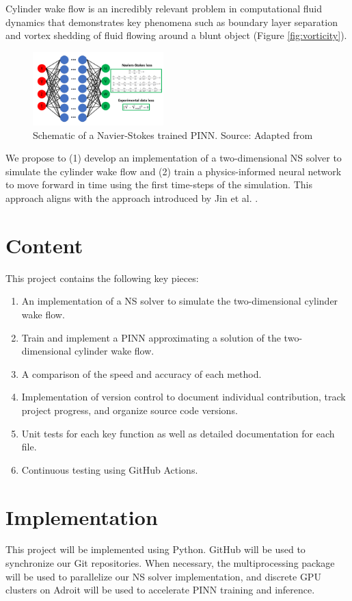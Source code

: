\documentclass[11pt, letterpaper]{article}
\begin{document}
Cylinder wake flow is an incredibly relevant problem in computational fluid dynamics that demonstrates key phenomena such as boundary layer separation and vortex shedding of fluid flowing around a blunt object (Figure \ref{fig:vorticity}).

\begin{figure}[!ht]
    \centering
    \includegraphics[width=0.45\textwidth]{Figures/Proposal/PINN.png}
    \caption{Schematic of a Navier-Stokes trained PINN. Source: Adapted from \cite{munafo_english_2021}}
    \label{fig:PINN_example}
\end{figure}

We propose to (1) develop an implementation of a two-dimensional NS solver to simulate the cylinder wake flow and (2) train a physics-informed neural network to move forward in time using the first time-steps of the simulation. This approach aligns with the approach introduced by Jin et al. \cite{jin2021nsfnets}.


\section*{Content}
This project contains the following key pieces:

\begin{enumerate}
    \item An implementation of a NS solver to simulate the two-dimensional cylinder wake flow.
    \item Train and implement a PINN approximating a solution of the two-dimensional cylinder wake flow.
    \item A comparison of the speed and accuracy of each method.
    \item Implementation of version control to document individual contribution, track project progress, and organize source code versions.
    \item Unit tests for each key function as well as detailed documentation for each file.
    \item Continuous testing using GitHub Actions.
\end{enumerate}

\section*{Implementation}
This project will be implemented using Python. GitHub will be used to synchronize our Git repositories. When necessary, the multiprocessing package will be used to parallelize our NS solver implementation, and discrete GPU clusters on Adroit will be used to accelerate PINN training and inference.

\newpage
\printbibliography
\end{document}
